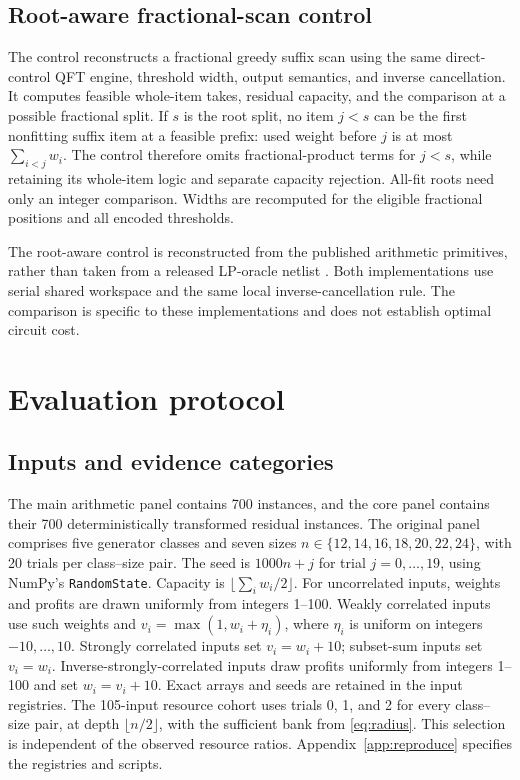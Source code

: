 \documentclass[referee,pdflatex,sn-mathphys-num]{sn-jnl}
\theoremstyle{thmstyleone}
\theoremstyle{thmstyletwo}
\begin{document}
\subsection{Root-aware fractional-scan control}
The control reconstructs a fractional greedy suffix scan using the same direct-control QFT engine, threshold width, output semantics, and inverse cancellation. It computes feasible whole-item takes, residual capacity, and the comparison at a possible fractional split. If $s$ is the root split, no item $j<s$ can be the first nonfitting suffix item at a feasible prefix: used weight before $j$ is at most $\sum_{i<j}w_i$. The control therefore omits fractional-product terms for $j<s$, while retaining its whole-item logic and separate capacity rejection. All-fit roots need only an integer comparison. Widths are recomputed for the eligible fractional positions and all encoded thresholds.

The root-aware control is reconstructed from the published arithmetic primitives, rather than taken from a released LP-oracle netlist \cite{wilkening2025,wilkening2025code}. Both implementations use serial shared workspace and the same local inverse-cancellation rule. The comparison is specific to these implementations and does not establish optimal circuit cost.

\section{Evaluation protocol}\label{sec:methods}
\subsection{Inputs and evidence categories}
The main arithmetic panel contains 700 instances, and the core panel contains their 700 deterministically transformed residual instances. The original panel comprises five generator classes and seven sizes $n\in\{12,14,16,18,20,22,24\}$, with 20 trials per class--size pair. The seed is $1000n+j$ for trial $j=0,\ldots,19$, using NumPy's \texttt{RandomState}. Capacity is $\lfloor\sum_iw_i/2\rfloor$. For uncorrelated inputs, weights and profits are drawn uniformly from integers 1--100. Weakly correlated inputs use such weights and $v_i=\max(1,w_i+\eta_i)$, where $\eta_i$ is uniform on integers $-10,\ldots,10$. Strongly correlated inputs set $v_i=w_i+10$; subset-sum inputs set $v_i=w_i$. Inverse-strongly-correlated inputs draw profits uniformly from integers 1--100 and set $w_i=v_i+10$. Exact arrays and seeds are retained in the input registries. The 105-input resource cohort uses trials 0, 1, and 2 for every class--size pair, at depth $\lfloor n/2\rfloor$, with the sufficient bank from \eqref{eq:radius}. This selection is independent of the observed resource ratios. Appendix~\ref{app:reproduce} specifies the registries and scripts.
\end{document}
